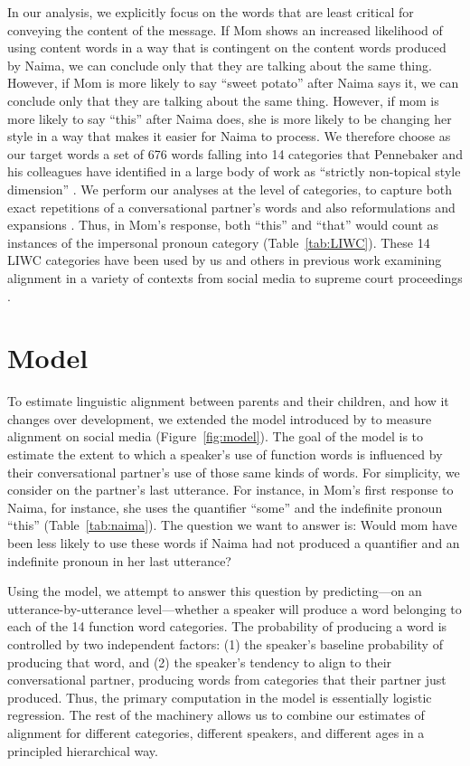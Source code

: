 \documentclass[10pt,letterpaper]{article}
\begin{document}
In our analysis, we explicitly focus on the words that are least critical for conveying the content of the message. If Mom shows an increased likelihood of using content words in a way that is contingent on the content words produced by Naima, we can conclude only that they are talking about the same thing. However, if Mom is more likely to say ``sweet potato'' after Naima says it, we can conclude only that they are talking about the same thing. However, if mom is more likely to say ``this'' after Naima does, she is more likely to be changing her style in a way that makes it easier for Naima to process. We therefore choose as our target words a set of 676 words falling into 14 categories that Pennebaker and his colleagues have identified in a large body of work as ``strictly non-topical style dimension'' \cite<Linguistic Inquiry and Word Count>{pennebaker2007}. We perform our analyses at the level of categories, to capture both exact repetitions of a conversational partner's words and also reformulations and expansions \cite{chouinard2003}. Thus, in Mom's response, both ``this'' and ``that'' would count as instances of the impersonal pronoun category (Table~\ref{tab:LIWC}). These 14 LIWC categories have been used by us and others in previous work examining alignment in a variety of contexts from social media to supreme court proceedings \cite{danescu-niculescu-mizil2012, guo2015}.

\section{Model}
To estimate linguistic alignment between parents and their children, and how it changes over development, we extended the model introduced by  to measure alignment on social media (Figure~\ref{fig:model}). The goal of the model is to estimate the extent to which a speaker's use of function words is influenced by their conversational partner's use of those same kinds of words. For simplicity, we consider on the partner's last utterance. For instance, in Mom's first response to Naima, for instance, she uses the quantifier ``some'' and the indefinite pronoun ``this'' (Table~\ref{tab:naima}). The question we want to answer is: Would mom have been less likely to use these words if Naima had not produced a quantifier and an indefinite pronoun in her last utterance? 

Using the model, we attempt to answer this question by predicting---on an utterance-by-utterance level---whether a speaker will produce a word belonging to each of the 14 function word categories. The probability of producing a word is controlled by two independent factors: (1) the speaker's baseline probability of producing that word, and (2) the speaker's tendency to align to their conversational partner, producing words from categories that their partner just produced. Thus, the primary computation in the model is essentially logistic regression. The rest of the machinery allows us to combine our estimates of alignment for different categories, different speakers, and different ages in a principled hierarchical way.
\end{document}
